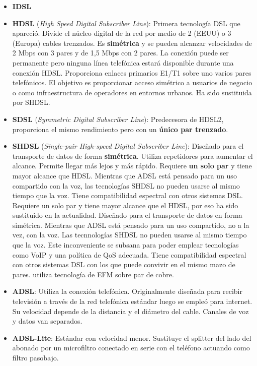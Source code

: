 \documentclass[10pt,portrait, twocolumn]{article}
\begin{document}
	\begin{itemize}
		\item \textbf{IDSL}
		\item \textbf{HDSL} (\textit{High Speed Digital Subscriber Line}): Primera tecnología DSL que apareció. Divide el núcleo digital de la red por medio de 2 (EEUU) o 3 (Europa) cables trenzados. Es \textbf{simétrica} y se pueden alcanzar velocidades de 2 Mbps con 3 pares y de 1,5 Mbps con 2 pares. La conexión puede ser permanente pero ninguna línea telefónica estará disponible durante una conexión HDSL. Proporciona enlaces primarios E1/T1 sobre uno  varios pares telefónicos. El objetivo es proporcionar acceso simétrico a usuarios de negocio o como infraestructura de operadores en entornos urbanos. Ha sido sustituida por SHDSL.
		\item \textbf{SDSL} (\textit{Symmetric Digital Subscriber Line}): Predecesora de HDSL2, proporciona el mismo rendimiento pero con un \textbf{único par trenzado}. 
		\item \textbf{SHDSL} (\textit{Single-pair High-speed Digital Subscriber Line}): Diseñado para el transporte de datos de forma \textbf{simétrica}. Utiliza repetidores para aumentar el alcance. Permite llegar más lejos y más rápido. Requiere \textbf{un solo par} y tiene mayor alcance que HDSL. Mientras que ADSL está pensado para un uso compartido con la voz, las tecnologías SHDSL no pueden usarse al mismo tiempo que la voz. Tiene compatibilidad espectral con otros sistemas DSL. Requiere un solo par y tiene mayor alcance que el HDSL, por eso ha sido sustituido en la actualidad. Diseñado para el transporte de datos en forma simétrica. Mientras que ADSL está pensado para un uso compartido, no a la vez, con la voz. Las tecnnologías SHDSL no pueden usarse al mismo tiempo que la voz. Este inconveniente se subsana para poder emplear tecnologías como VoIP y una política de QoS adecuada. Tiene compatibilidad espectral con otros sistemas DSL con los que puede convivir en el mismo mazo de pares. utiliza tecnología de EFM sobre par de cobre.
		\item \textbf{ADSL}: Utiliza la conexión telefónica. Originalmente diseñada para recibir televisión a través de la red telefónica estándar luego se empleó para internet. Su velocidad depende de la distancia y el diámetro del cable. Canales de voz y datos van separados.
		\item \textbf{ADSL-Lite}: Estándar con velocidad menor. Sustituye el splitter del lado del abonado por un microfiltro conectado en serie con el teléfono actuando como filtro pasobajo.

\end{itemize}
\end{document}
